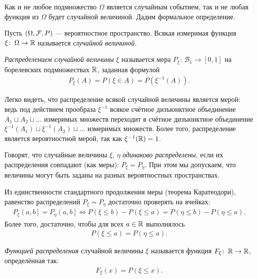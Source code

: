 \documentclass[../main.tex]{subfiles}
\begin{document}
Как и не любое подмножество $ \Omega $ является случайным событием, так и не любая функция из $ \Omega $ будет случайной величиной. Дадим формальное определение.

\begin{df}
 Пусть $(\Omega, \mathcal F, P)$ --- вероятностное пространство. Всякая измеримая функция $\xi \colon\, \Omega \to \mathbb{R}$ называется \textit{случайной величиной}.
\end{df}
\begin{df}
 \textit{Распределением случайной величины} $\xi$ называется мера $ P_{\xi} \colon\, \mathcal B_1 \to [0, 1] $ на борелевских подмножествах $\mathbb{R}$, заданная формулой
 \begin{align*}
  P_{\xi}(A) = P(\xi \in A) = P(\xi^{-1}(A)).
 \end{align*} 
\end{df}
\begin{remrk*}
 Легко видеть, что распределение всякой случайной величины является мерой: ведь под действием прообраза $ \xi^{-1} $ всякое счётное дизъюнктное объединение $ A_1 \sqcup A_2 \sqcup \ldots $ измеримых множеств переходит в счётное дизъюнктное объединение $ \xi^{-1}(A_1) \sqcup \xi^{-1}(A_2) \sqcup \ldots $ измеримых множеств. Более того, распределение является вероятностной мерой, так как $ \xi^{-1}(\mathbb{R}) = 1 $.
\end{remrk*}
\begin{df*}
 Говорят, что случайные величины $\xi$, $\eta$ \textit{одинаково распределены}, если их распределения совпадают (как меры): $P_{\xi} = P_{\eta}$. При этом мы допускаем, что величины могут быть заданы на разных вероятностных пространствах.
\end{df*}
\begin{remrk}
 \label{remark:_distribution_eq}
 Из единственности стандартного продолжения меры (теорема Каратеодори), равенство распределений $P_{\xi} = P_{\eta}$  достаточно проверять на ячейках:
 \begin{align*}
  P_{\xi} \left(a, b\right] = P_{\eta} \left(a, b\right]  \iff P(\xi \leqslant b) - P(\xi \leqslant a) =  P(\eta \leqslant b) - P(\eta \leqslant a)
 .\end{align*} Более того, достаточно, чтобы для всех $a \in \mathbb{R}$ выполнялось
 \begin{align*}
  P(\xi \leqslant a) = P(\eta \leqslant a).
 \end{align*} 
\end{remrk}
\begin{df}
 \textit{Функцией распределения} случайной величины $\xi$ называется функция $F_{\xi} \colon\, \mathbb{R} \to \mathbb{R}$, определённая так:
 \begin{align*}
  F_{\xi}(x) = P(\xi \leqslant x).
 \end{align*} 
\end{df}
\end{document}
